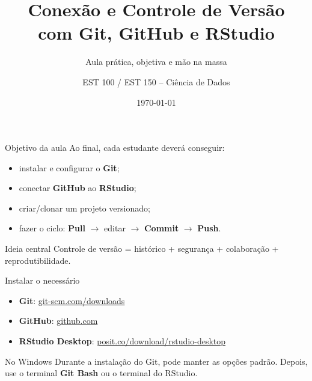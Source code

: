 \documentclass[10pt,aspectratio=169]{beamer}
\title[Git, GitHub e RStudio]{Conexão e Controle de Versão\\com Git, GitHub e RStudio}
\subtitle{Aula prática, objetiva e mão na massa}
\author{EST 100 / EST 150 -- Ciência de Dados}
\institute{Universidade Federal de Viçosa}
\date{\today}
\begin{document}
\begin{frame}
  \titlepage
\end{frame}

\begin{frame}{Objetivo da aula}
\large
Ao final, cada estudante deverá conseguir:

\vspace{0.4cm}
\begin{itemize}
  \item instalar e configurar o \textbf{Git};
  \item conectar \textbf{GitHub} ao \textbf{RStudio};
  \item criar/clonar um projeto versionado;
  \item fazer o ciclo: \textbf{Pull} $\rightarrow$ editar $\rightarrow$ \textbf{Commit} $\rightarrow$ \textbf{Push}.
\end{itemize}

\vspace{0.4cm}
\begin{block}{Ideia central}
Controle de versão = histórico + segurança + colaboração + reprodutibilidade.
\end{block}
\end{frame}

\begin{frame}{Instalar o necessário}
\large
\begin{itemize}
  \item \textbf{Git}: \href{https://git-scm.com/downloads}{git-scm.com/downloads}
  \item \textbf{GitHub}: \href{https://github.com/}{github.com}
  \item \textbf{RStudio Desktop}: \href{https://posit.co/download/rstudio-desktop/}{posit.co/download/rstudio-desktop}
\end{itemize}

\vspace{0.35cm}
\begin{block}{No Windows}
Durante a instalação do Git, pode manter as opções padrão.\newline
Depois, use o terminal \textbf{Git Bash} ou o terminal do RStudio.
\end{block}
\end{frame}
\end{document}
